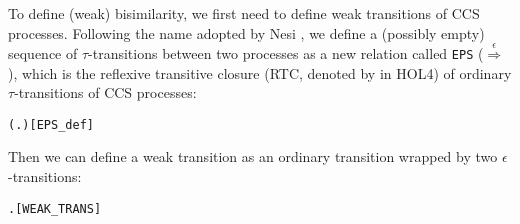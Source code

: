 To define (weak) bisimilarity, we first need to define weak
transitions of CCS processes. Following the name adopted by Nesi \cite{Nesi:1992ve},
we define a (possibly empty) sequence of $\tau$-transitions between
two processes as
a new relation called \texttt{EPS}
($\overset{\epsilon}{\Rightarrow}$), which is the
reflexive transitive closure (RTC, denoted by \mbox{\color{blue}{$^*$}} in
HOL4) of ordinary $\tau$-transitions of CCS processes:
\begin{alltt}
 \HOLSymConst{=} (\HOLTokenLambda{} .  \HOLTokenTransBegin\HOLSymConst{\ensuremath{\tau}}\HOLTokenTransEnd {})\HOLSymConst{\HOLTokenSupStar{}}\hfill{[EPS_def]}
\end{alltt}
Then we can define a weak transition as an ordinary transition wrapped by
two $\epsilon$-transitions:
\begin{alltt}
 \HOLTokenWeakTransBegin{}\HOLTokenWeakTransEnd {} \HOLSymConst{\HOLTokenEquiv{}} \HOLSymConst{\HOLTokenExists{}} .  \HOLSymConst{\HOLTokenEPS}  \HOLSymConst{\HOLTokenConj{}}  \HOLTokenTransBegin{}\HOLTokenTransEnd {} \HOLSymConst{\HOLTokenConj{}}  \HOLSymConst{\HOLTokenEPS} \hfill{[WEAK_TRANS]}
\end{alltt}

